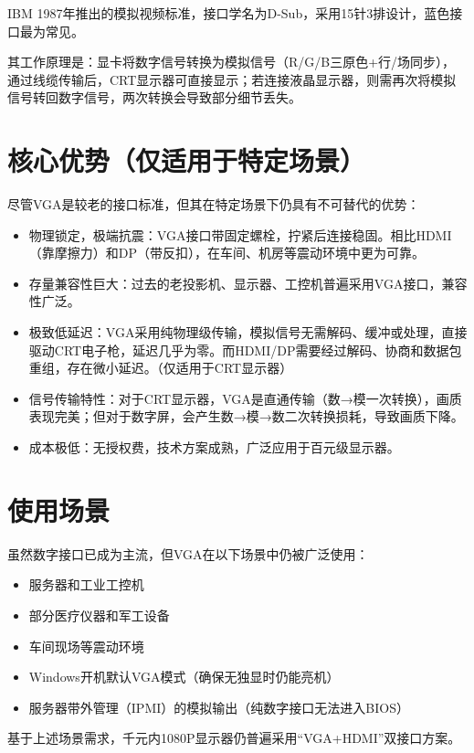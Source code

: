\documentclass[12pt,UTF8]{ctexbook}
\begin{document}
IBM 1987年推出的模拟视频标准，接口学名为D-Sub，采用15针3排设计，蓝色接口最为常见。

其工作原理是：显卡将数字信号转换为模拟信号（R/G/B三原色+行/场同步），通过线缆传输后，CRT显示器可直接显示；若连接液晶显示器，则需再次将模拟信号转回数字信号，两次转换会导致部分细节丢失。

\section{核心优势（仅适用于特定场景）}

尽管VGA是较老的接口标准，但其在特定场景下仍具有不可替代的优势：

\begin{itemize}[leftmargin=2em]
  \item 物理锁定，极端抗震：VGA接口带固定螺栓，拧紧后连接稳固。相比HDMI（靠摩擦力）和DP（带反扣），在车间、机房等震动环境中更为可靠。
  \item 存量兼容性巨大：过去的老投影机、显示器、工控机普遍采用VGA接口，兼容性广泛。
  \item 极致低延迟：VGA采用纯物理级传输，模拟信号无需解码、缓冲或处理，直接驱动CRT电子枪，延迟几乎为零。而HDMI/DP需要经过解码、协商和数据包重组，存在微小延迟。（仅适用于CRT显示器）
  \item 信号传输特性：对于CRT显示器，VGA是直通传输（数→模一次转换），画质表现完美；但对于数字屏，会产生数→模→数二次转换损耗，导致画质下降。
  \item 成本极低：无授权费，技术方案成熟，广泛应用于百元级显示器。
\end{itemize}

\section{使用场景}

虽然数字接口已成为主流，但VGA在以下场景中仍被广泛使用：

\begin{itemize}[leftmargin=2em]
  \item 服务器和工业工控机
  \item 部分医疗仪器和军工设备
  \item 车间现场等震动环境
  \item Windows开机默认VGA模式（确保无独显时仍能亮机）
  \item 服务器带外管理（IPMI）的模拟输出（纯数字接口无法进入BIOS）
\end{itemize}

基于上述场景需求，千元内1080P显示器仍普遍采用“VGA+HDMI”双接口方案。
\end{document}
